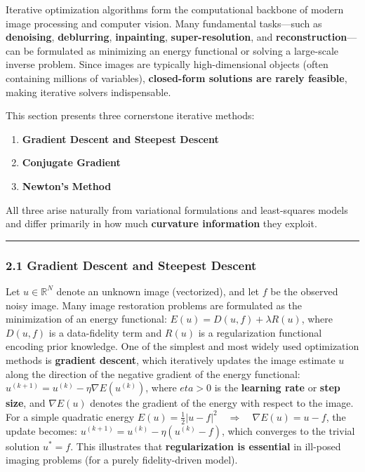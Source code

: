 \documentclass[11pt]{article}
\providecommand{\tightlist}{%
      \setlength{\itemsep}{0pt}\setlength{\parskip}{0pt}}
\begin{document}
Iterative optimization algorithms form the computational backbone of
modern image processing and computer vision. Many fundamental
tasks---such as \textbf{denoising}, \textbf{deblurring},
\textbf{inpainting}, \textbf{super-resolution}, and
\textbf{reconstruction}---can be formulated as minimizing an energy
functional or solving a large-scale inverse problem. Since images are
typically high-dimensional objects (often containing millions of
variables), \textbf{closed-form solutions are rarely feasible}, making
iterative solvers indispensable.

This section presents three cornerstone iterative methods:

\begin{enumerate}
\def\labelenumi{\arabic{enumi}.}
\tightlist
\item
  \textbf{Gradient Descent and Steepest Descent}
\item
  \textbf{Conjugate Gradient}
\item
  \textbf{Newton's Method}
\end{enumerate}

All three arise naturally from variational formulations and
least-squares models and differ primarily in how much \textbf{curvature
information} they exploit.

\begin{center}\rule{0.5\linewidth}{0.5pt}\end{center}

\hypertarget{gradient-descent-and-steepest-descent}{%
\subsubsection{\texorpdfstring{\textbf{2.1 Gradient Descent and Steepest
Descent}}{2.1 Gradient Descent and Steepest Descent}}\label{gradient-descent-and-steepest-descent}}

Let \(u \in \mathbb{R}^N\) denote an unknown image (vectorized), and let
\(f\) be the observed noisy image. Many image restoration problems are
formulated as the minimization of an energy functional:
\(E(u) = D(u,f) + \lambda R(u)\), where \(D(u,f)\) is a data-fidelity
term and \(R(u)\) is a regularization functional encoding prior
knowledge. One of the simplest and most widely used optimization methods
is \textbf{gradient descent}, which iteratively updates the image
estimate \(u\) along the direction of the negative gradient of the
energy functional: \(u^{(k+1)} = u^{(k)} - \eta \nabla E(u^{(k)})\),
where \(eta > 0\) is the \textbf{learning rate} or \textbf{step size},
and \(\nabla E(u)\) denotes the gradient of the energy with respect to
the image. For a simple quadratic energy
\(E(u) = \frac{1}{2}|u - f|^2 \quad \Rightarrow \quad \nabla E(u) = u - f\),
the update becomes: \(u^{(k+1)} = u^{(k)} - \eta (u^{(k)} - f)\), which
converges to the trivial solution \(u^\ast = f\). This illustrates that
\textbf{regularization is essential} in ill-posed imaging problems (for
a purely fidelity-driven model).
\end{document}
